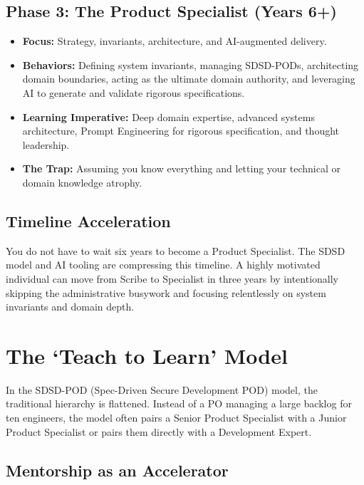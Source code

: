 \subsection{Phase 3: The Product Specialist (Years
6+)}\label{phase-3-the-product-specialist-years-6}

\begin{itemize}
\tightlist
\item
  \textbf{Focus:} Strategy, invariants, architecture, and AI-augmented
  delivery.
\item
  \textbf{Behaviors:} Defining system invariants, managing SDSD-PODs,
  architecting domain boundaries, acting as the ultimate domain
  authority, and leveraging AI to generate and validate rigorous
  specifications.
\item
  \textbf{Learning Imperative:} Deep domain expertise, advanced systems
  architecture, Prompt Engineering for rigorous specification, and
  thought leadership.
\item
  \textbf{The Trap:} Assuming you know everything and letting your
  technical or domain knowledge atrophy.
\end{itemize}

\subsection{Timeline Acceleration}\label{timeline-acceleration}

You do not have to wait six years to become a Product Specialist. The
SDSD model and AI tooling are compressing this timeline. A highly
motivated individual can move from Scribe to Specialist in three years
by intentionally skipping the administrative busywork and focusing
relentlessly on system invariants and domain depth.

\bigskip

\section{The `Teach to Learn' Model}\label{the-teach-to-learn-model}

In the SDSD-POD (Spec-Driven Secure Development POD) model, the
traditional hierarchy is flattened. Instead of a PO managing a large
backlog for ten engineers, the model often pairs a Senior Product
Specialist with a Junior Product Specialist or pairs them directly with
a Development Expert.

\subsection{Mentorship as an
Accelerator}\label{mentorship-as-an-accelerator}

